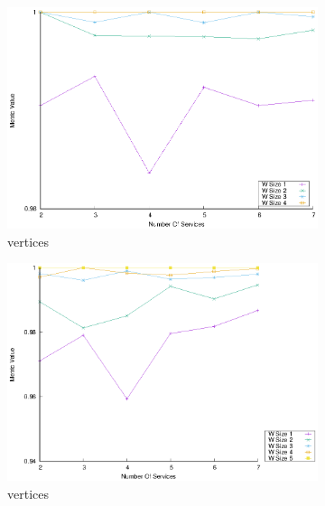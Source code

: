 \begin{figure}[!htb]
\begin{subfigure}{0.48\textwidth}
    \includegraphics[width=\textwidth]{Images/graphs/window_quality_performance_diff_qual_n7_s7_50_80_n4}
    \caption{ vertices}
    \label{fig:quality_window_average_qualitative_n4}
  \end{subfigure}
  \begin{subfigure}{0.48\textwidth}
    \includegraphics[width=\textwidth]{Images/graphs/window_quality_performance_diff_qual_n7_s7_50_80_n5}
    \caption{ vertices}
    \label{fig:quality_window_average_qualitative_n5}
  \end{subfigure}
  \begin{subfigure}{0.48\textwidth}

\end{subfigure}
\end{figure}
